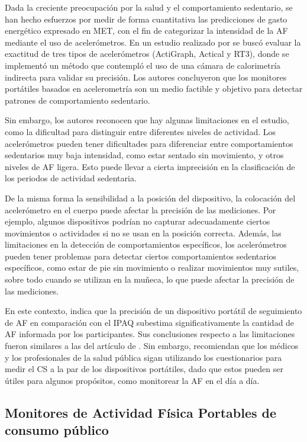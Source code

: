 Dada la creciente preocupación por la salud y el comportamiento sedentario, se han hecho esfuerzos por medir de forma cuantitativa las predicciones de gasto energético expresado en MET, con el fin de categorizar la intensidad de la AF mediante el uso de acelerómetros. En un estudio realizado por \citet{Rothney2008Validity} se buscó evaluar la exactitud de tres tipos de acelerómetros (ActiGraph, Actical y RT3), donde se implementó un método que contempló el uso de una cámara de calorimetría indirecta para validar su precisión. Los autores concluyeron que los monitores portátiles basados en acelerometría son un medio factible y objetivo para detectar patrones de comportamiento sedentario.

Sin embargo, los autores reconocen que hay algunas limitaciones en el estudio, como la dificultad para distinguir entre diferentes niveles de actividad. Los acelerómetros pueden tener dificultades para diferenciar entre comportamientos sedentarios muy baja intensidad, como estar sentado sin movimiento, y otros niveles de AF ligera. Esto puede llevar a cierta imprecisión en la clasificación de los periodos de actividad sedentaria.

De la misma forma la sensibilidad a la posición del dispositivo, la colocación del acelerómetro en el cuerpo puede afectar la precisión de las mediciones. Por ejemplo, algunos dispositivos podrían no capturar adecuadamente ciertos movimientos o actividades si no se usan en la posición correcta. Además, las limitaciones en la detección de comportamientos específicos, los acelerómetros pueden tener problemas para detectar ciertos comportamientos sedentarios específicos, como estar de pie sin movimiento o realizar movimientos muy sutiles, sobre todo cuando se utilizan en la muñeca, lo que puede afectar la precisión de las mediciones.

En este contexto, \citet{Henriksen2018} indica que la precisión de un dispositivo portátil de seguimiento de AF en comparación con el IPAQ subestima significativamente la cantidad de AF informada por los participantes. Sus conclusiones respecto a las limitaciones fueron similares a las del artículo de \citet{Rothney2008Validity}. Sin embargo, recomiendan que los médicos y los profesionales de la salud pública sigan utilizando los cuestionarios para medir el CS a la par de los dispositivos portátiles, dado que estos pueden ser útiles para algunos propósitos, como monitorear la AF en el día a día.

\subsection{Monitores de Actividad Física Portables de consumo público}
\label{subsec:monitores_af_consumo_publico}

